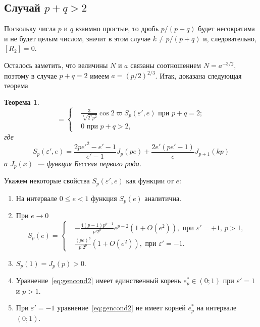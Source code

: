 \documentclass[14pt,a4paper%
]{extarticle}
\newtheorem{theorem}{Теорема}
\begin{document}
\subsection*{Случай $p+q>2$}
Поскольку числа $p$ и $q$ взаимно простые, то дробь $p/(p+q)$ будет несократима и не будет целым числом, значит в этом случае $k\neq p/(p+q)$ и, следовательно, $[R_2]=0$.

Осталось заметить, что величины $N$ и $a$ связаны соотношением $N=a^{-3/2}$, поэтому в случае  $p+q=2$ имеем $a=(p/2)^{2/3}$.
Итак, доказана следующая теорема
\begin{theorem}
\begin{equation*}
[R_2]=\left\{
\begin{aligned}
{}&\frac{3}{\sqrt[3]{2^7p^2}}\cos2\varpi S_p(\varepsilon',e)\text{ при }p+q=2;\\
{}&0\text{ при }p+q>2,
\end{aligned}
\right.
\end{equation*}
где
\begin{equation}
S_p(\varepsilon',e)=\frac{2p{e'}^2-e'-1}{e'-1}J_p(pe)+\frac{2e'(pe'-1)}e J_{p+1}(kp)
\end{equation}
а $J_p(x)$~--- функция Бесселя первого рода.
\end{theorem}

Укажем некоторые свойства $S_p(\varepsilon',e)$ как функции от $e$:
\begin{enumerate}
\item На интервале $0\leqslant  e<1$ функция $S_p(e)$ аналитична.
\item При $e\rightarrow 0$
\begin{equation*}
S_p(e)=\left\{
\begin{aligned}
{}&-\frac{4(p-1)p^{p-1}}{p!2^p}e^{p-2}\left(1+O(e^2)\right),\text{ при }\varepsilon'=+1,\,p>1,\\
{}&\frac{(pe)^{p}}{p!2^p}\left(1+O(e^2)\right),\text{ при }\varepsilon'=-1.
\end{aligned}
\right.
\end{equation*}
\item $S_p(1)=J_p(p)>0$.
\item Уравнение~\eqref{eq:gencond2} имеет единственный корень $e^*_p\in(0;1)$ при $\varepsilon'=1$ и $p>1$.
\item При $\varepsilon'=-1$ уравнение~\eqref{eq:gencond2} не имеет корней $e^*_p$ на интервале $(0;1)$.
\end{enumerate}
\end{document}
